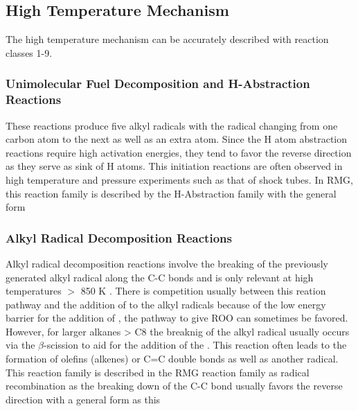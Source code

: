 \subsection{High Temperature Mechanism}

The high temperature mechanism can be accurately described with reaction classes 1-9.
\subsubsection{Unimolecular Fuel Decomposition and H-Abstraction Reactions} 
These reactions produce five alkyl radicals with the radical changing from one carbon atom to the next as well as an extra  atom. Since the H atom abstraction reactions require high activation energies, they tend to favor the reverse direction as they serve as sink of H atoms. This initiation reactions are often observed in high temperature and pressure experiments such as that of shock tubes. In RMG, this reaction family is described by the H-Abstraction family with the general form 



\subsubsection{Alkyl Radical Decomposition Reactions}
Alkyl radical decomposition reactions involve the breaking of the previously generated alkyl radical along the C-C bonds and is only relevant at high temperatures $>$ 850 K \cite{Curran1998AOxidation}. There is competition usually between this reation pathway and the addition of  to the alkyl radicals because of the low energy barrier for the addition of , the pathway to give ROO can sometimes be favored. However, for larger alkanes > C8 the breaknig of the alkyl radical usually occurs via the $\beta$-scission to aid for the addition of the . This reaction often leads to the formation of olefins (alkenes) or C=C double bonds as well as another radical. This reaction family is described in the RMG reaction family as radical recombination as the breaking down of the C-C bond usually favors the reverse direction with a general form as this 


